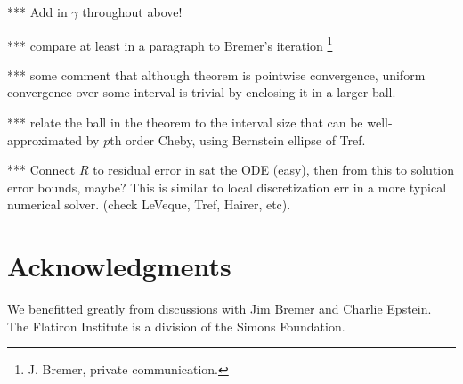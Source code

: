 \documentclass[10pt]{article}
\begin{document}
*** Add in $\gamma$ throughout above!

*** compare at least in a paragraph to Bremer's iteration
\footnote{J. Bremer, private communication.}

*** some comment that although theorem is pointwise convergence,
uniform convergence over some interval is trivial by enclosing it in
a larger ball.

*** relate the ball in the theorem to the interval size that
can be well-approximated by $p$th order Cheby,
using Bernstein ellipse of Tref.

*** Connect $R$ to residual error in sat the ODE (easy),
then from this to solution error bounds, maybe?
This is similar to local discretization err
in a more typical numerical solver.
(check LeVeque, Tref, Hairer, etc).


\section*{Acknowledgments}
We benefitted greatly from discussions with Jim Bremer
and Charlie Epstein.
The Flatiron Institute is a division of the Simons Foundation.






\end{document}
